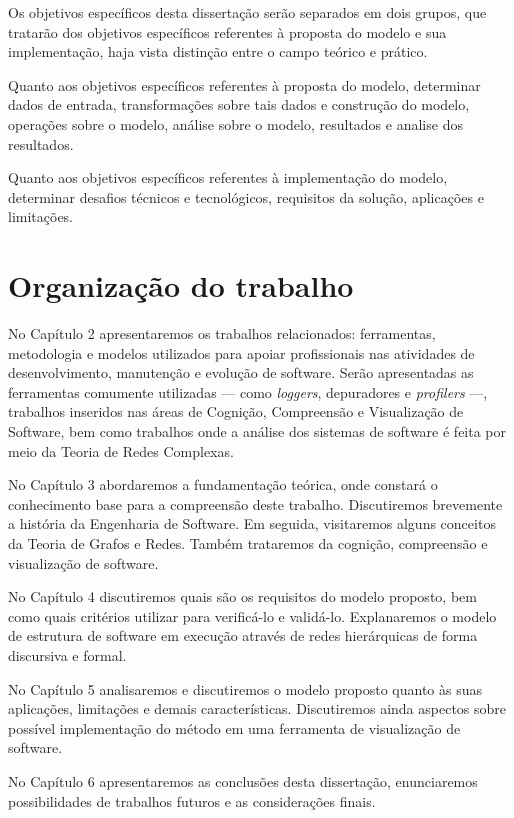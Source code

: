 Os objetivos específicos desta dissertação serão separados em dois grupos, que
tratarão dos objetivos específicos referentes à proposta do modelo e sua
implementação, haja vista distinção entre o campo teórico e prático.

Quanto aos objetivos específicos referentes à proposta do modelo, determinar
dados de entrada, transformações sobre tais dados e construção do modelo,
operações sobre o modelo, análise sobre o modelo, resultados e analise dos
resultados.

Quanto aos objetivos específicos referentes à implementação do modelo,
determinar desafios técnicos e tecnológicos, requisitos da solução, aplicações e
limitações.

\section{Organização do trabalho}
\label{sec:OrganizaçãoTrabalho}

No Capítulo 2 apresentaremos os trabalhos relacionados: ferramentas, metodologia
e modelos utilizados para apoiar profissionais nas atividades de 
desenvolvimento, manutenção e evolução de software. Serão apresentadas as
ferramentas comumente utilizadas --- como \textit{loggers}, depuradores e
\textit{profilers} ---, trabalhos inseridos nas áreas de Cognição, Compreensão
e Visualização de Software, bem como trabalhos onde a análise dos sistemas de
software é feita por meio da Teoria de Redes Complexas.

No Capítulo 3 abordaremos a fundamentação teórica, onde constará o conhecimento
base para a compreensão deste trabalho. Discutiremos brevemente a história da
Engenharia de Software. Em seguida, visitaremos alguns conceitos da Teoria de
Grafos e Redes. Também trataremos da cognição, compreensão e visualização de
software.

No Capítulo 4 discutiremos quais são os requisitos do modelo proposto, bem como
quais critérios utilizar para verificá-lo e validá-lo. Explanaremos o modelo de
estrutura de software em execução através de redes hierárquicas de forma
discursiva e formal.

No Capítulo 5 analisaremos e discutiremos o modelo proposto quanto às suas
aplicações, limitações e demais características. Discutiremos ainda aspectos
sobre possível implementação do método em uma ferramenta de visualização de
software.

No Capítulo 6 apresentaremos as conclusões desta dissertação, enunciaremos
possibilidades de trabalhos futuros e as considerações finais.

